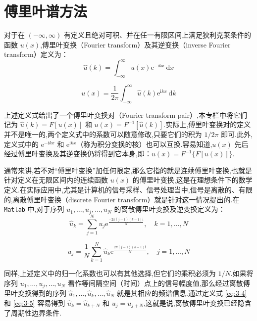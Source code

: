 \section{傅里叶谱方法}

对于在 $(-\infty, \infty)$ 有定义且绝对可积、并在任一有限区间上满足狄利克莱条件的函数 $u(x)$,傅里叶变换（Fourier transform）及其逆变换（inverse Fourier transform）定义为：
\begin{equation}
    \hat{u}(k) = \int_{-\infty}^{\infty} u(x) \mathrm{e}^{-\mathrm{i} k x} \mathrm{~d} x \label{eq:3-1}
\end{equation}

\begin{equation}
    u(x) = \frac{1}{2 \pi} \int_{-\infty}^{\infty} \hat{u}(k) \mathrm{e}^{\mathrm{i} k x} \mathrm{~d} k \label{eq:3-2}
\end{equation}

上述定义式给出了一个傅里叶变换对（Fourier transform pair）,本专栏中将它们记为 $\hat{u}(k) = F[u(x)]$ 和 $u(x) = F^{-1}[\hat{u}(k)]$.实际上,傅里叶变换对的定义并不是唯一的,两个定义式中的系数可以随意修改,只要它们的积为 $1 / 2 \pi$ 即可.此外,定义式中的 $\mathrm{e}^{-\mathrm{i} k x}$ 和 $\mathrm{e}^{\mathrm{i} k x}$（称为积分变换的核）也可以互换.容易知道,$u(x)$ 先后经过傅里叶变换及其逆变换仍将得到它本身,即：$u(x) = F^{-1}\{F[u(x)]\}$.

通常来讲,若不对“傅里叶变换”加任何限定,那么它指的就是连续傅里叶变换,也就是针对定义在无限区间内的连续函数 $u(x)$ 的傅里叶变换,这是在理想条件下的数学定义.在实际应用中,尤其是计算机的信号采样、信号处理当中,信号是离散的、有限的,离散傅里叶变换（discrete Fourier transform）就是针对这一情况提出的.在 \texttt{Matlab} 中,对于序列 $u_1, \ldots, u_j, \ldots, u_N$ 的离散傅里叶变换及逆变换定义为：
\begin{equation}
    \hat{u}_k = \sum_{j=1}^N u_j \mathrm{e}^{\frac{-2 \pi(j-1)(k-1) \mathrm{i}}{N}}, \quad k=1, \ldots, N \label{eq:3-4}
\end{equation}

\begin{equation}
    u_j = \frac{1}{N} \sum_{k=1}^N \hat{u}_k \mathrm{e}^{\frac{2 \pi(j-1)(k-1) \mathrm{i}}{N}}, \quad j=1, \ldots, N \label{eq:3-5}
\end{equation}

同样,上述定义中的归一化系数也可以有其他选择,但它们的乘积必须为 $1 / N$.如果将序列 $u_1, \ldots, u_j, \ldots, u_N$ 看作等间隔空间（时间）点上的信号幅度值,那么经过离散傅里叶变换得到的序列 $\hat{u}_1, \ldots, \hat{u}_k, \ldots, \hat{u}_N$ 就是其相应的频谱信息.通过定义式 \eqref{eq:3-4} 和 \eqref{eq:3-5} 容易得到 $\hat{u}_k = \hat{u}_{k+N}$ 和 $u_j = u_{j+N}$,这就是说,离散傅里叶变换已经隐含了周期性边界条件.

